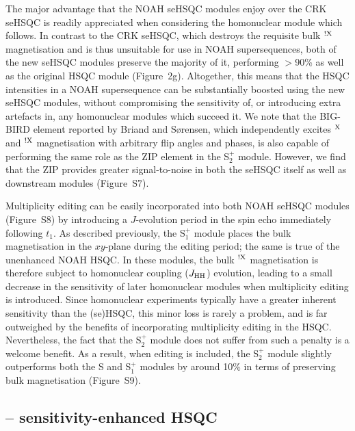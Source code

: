 \documentclass[final,twocolumn]{elsarticle}
\newcommand*{\noahS}{S}
\newcommand*{\noahSpa}{S$^+_1$}
\newcommand*{\noahSpb}{S$^+_2$}
\newcommand*{\proton}{\ce{^{1}H}}
\newcommand*{\nitrogen}{\ce{^{15}N}}
\newcommand*{\magn}[1]{\ce{^1H}$^{#1}$}
\newcommand*{\magnnot}[1]{\ce{^1H}$^{!#1}$}
\newcommand*{\jhh}{J_{\ce{HH}}}
\begin{document}
The major advantage that the NOAH seHSQC modules enjoy over the CRK seHSQC is readily appreciated when considering the homonuclear module which follows.
In contrast to the CRK seHSQC, which destroys the requisite bulk \magnnot{\ce{X}} magnetisation and is thus unsuitable for use in NOAH supersequences, both of the new seHSQC modules preserve the majority of it, performing $>$90\% as well as the original HSQC module (Figure~2g).
Altogether, this means that the HSQC intensities in a NOAH supersequence can be substantially boosted using the new seHSQC modules, without compromising the sensitivity of, or introducing extra artefacts in, any homonuclear modules which succeed it.
We note that the BIG-BIRD element reported by Briand and S{\o}rensen\cite{Briand1997JMR}, which independently excites \magn{\ce{X}} and \magnnot{\ce{X}} magnetisation with arbitrary flip angles and phases, is also capable of performing the same role as the ZIP element in the \noahSpb{} module.
However, we find that the ZIP provides greater signal-to-noise in both the seHSQC itself as well as downstream modules (Figure~S7).

Multiplicity editing\cite{Parella1997JMR} can be easily incorporated into both NOAH seHSQC modules (Figure~S8) by introducing a $J$-evolution period in the spin echo immediately following $t_1$.
As described previously, the \noahSpa{} module places the bulk magnetisation in the $xy$-plane during the editing period; the same is true of the unenhanced NOAH HSQC.
In these modules, the bulk \magnnot{\ce{X}} magnetisation is therefore subject to homonuclear coupling ($\jhh$) evolution, leading to a small decrease in the sensitivity of later homonuclear modules when multiplicity editing is introduced.
Since homonuclear experiments typically have a greater inherent sensitivity than the (se)HSQC, this minor loss is rarely a problem, and is far outweighed by the benefits of incorporating multiplicity editing in the HSQC.
Nevertheless, the fact that the \noahSpb{} module does not suffer from such a penalty is a welcome benefit.
As a result, when editing is included, the \noahSpb{} module slightly outperforms both the \noahS{} and \noahSpa{} modules by around 10\% in terms of preserving bulk magnetisation (Figure~S9).

\subsection{\proton{}--\nitrogen{} sensitivity-enhanced HSQC}
\end{document}
